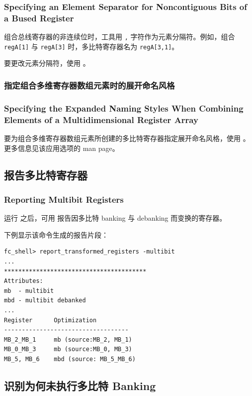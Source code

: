 \subsubsection*{Specifying an Element Separator for Noncontiguous Bits of a Bused Register}

组合总线寄存器的非连续位时，工具用 \texttt{,} 字符作为元素分隔符。例如，组合 \texttt{regA[1]} 与 \texttt{regA[3]} 时，多比特寄存器名为 \texttt{regA[3,1]}。

要更改元素分隔符，使用 。

\subsubsection{指定组合多维寄存器数组元素时的展开命名风格}
\subsubsection*{Specifying the Expanded Naming Styles When Combining Elements of a Multidimensional Register Array}

要为组合多维寄存器数组元素所创建的多比特寄存器指定展开命名风格，使用 。更多信息见该应用选项的 man page。

\subsection{报告多比特寄存器}
\subsubsection*{Reporting Multibit Registers}

运行  之后，可用  报告因多比特 banking 与 debanking 而变换的寄存器。

下例显示该命令生成的报告片段：
\begin{lstlisting}
fc_shell> report_transformed_registers -multibit
...
****************************************
Attributes:
mb  - multibit
mbd - multibit debanked
...
Register      Optimization
-----------------------------------
MB_2_MB_1     mb (source:MB_2, MB_1)
MB_0_MB_3     mb (source:MB_0, MB_3)
MB_5, MB_6    mbd (source: MB_5_MB_6)
\end{lstlisting}

\subsection{识别为何未执行多比特 Banking}
